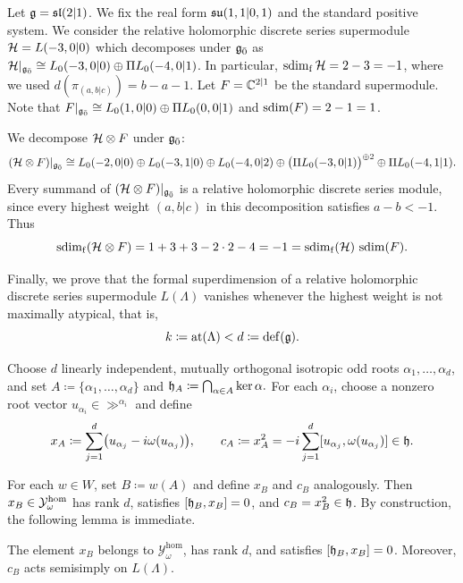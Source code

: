\begin{example}
Let $\gg=\sl(2\vert1)$. We fix the real form $\su(1,1\vert0,1)$
and the standard positive system. We consider the relative holomorphic discrete series supermodule $\HH=L(-3,0\vert0)$ which decomposes under $\even$ as $\HH|_{\even}
\cong L_0(-3,0\vert0)\oplus\Pi L_0(-4,0\vert1)$. In particular, $\fsdim \HH=2-3=-1$, where we used
$
d(\pi_{(a,b\vert c)})=b-a-1.$ Let $F=\CC^{2\vert1}$ be the standard supermodule. Note that 
$F|_{\even}
\cong L_0(1,0\vert0)\oplus\Pi L_0(0,0\vert1)$ and $\sdim(F)=2-1=1$. 

We decompose $\HH\otimes F$ under $\even$:
\[
(\HH\otimes F)\vert_{\even}
\cong
L_0(-2,0\vert0)
\oplus L_0(-3,1\vert0)
\oplus L_0(-4,0\vert2)\oplus\bigl(\Pi L_0(-3,0\vert1)\bigr)^{\oplus2}
\oplus\Pi L_0(-4,1\vert1).
\]
Every summand of $(\HH\otimes F)\vert_{\even}$ is a relative holomorphic discrete series module, since every highest weight $(a,b\vert c)$ in this decomposition
satisfies $a-b<-1$. Thus
\[
\fsdim(\HH\otimes F)
=1+3+3-2\cdot2-4
=-1
=\fsdim(\HH)\,\sdim(F).
\]
\end{example}


Finally, we prove that the formal superdimension of a relative holomorphic discrete series supermodule $L(\Lambda)$ vanishes whenever the highest weight is not maximally atypical, that is,
\begin{equation}
k\coloneqq\at(\Lambda)<d\coloneqq\defect(\gg).
\end{equation}

Choose $d$ linearly independent, mutually orthogonal isotropic odd roots $\alpha_1,\ldots,\alpha_d$, and set
$
A\coloneqq\{\alpha_1,\ldots,\alpha_d\}
$
and
$
\hh_A\coloneqq\bigcap_{\alpha\in A}\ker\alpha.
$
For each $\alpha_i$, choose a nonzero root vector $u_{\alpha_i}\in\gg^{\alpha_i}$ and define
\begin{equation}
x_A\coloneqq
\sum_{j=1}^d\bigl(u_{\alpha_j}-i\omega(u_{\alpha_j})\bigr),
\qquad
c_A\coloneqq x_A^2
=-i\sum_{j=1}^d[u_{\alpha_j},\omega(u_{\alpha_j})]\in\hh.
\end{equation}

For each $w\in W$, set $B\coloneqq w(A)$ and define $x_B$ and $c_B$ analogously. Then $x_B\in\YY_\omega^{\hom}$ has rank $d$, satisfies $[\hh_B,x_B]=0$, and $c_B=x_B^2\in\hh$. By construction, the following lemma is immediate.


\begin{lemma}\label{lemm::properties_x_B}
The element $x_B$ belongs to $\mathcal Y_\omega^{\hom}$, has rank $d$, and satisfies $[\hh_B,x_B]=0$. Moreover, $c_B$ acts semisimply on $L(\Lambda)$.
\end{lemma}

